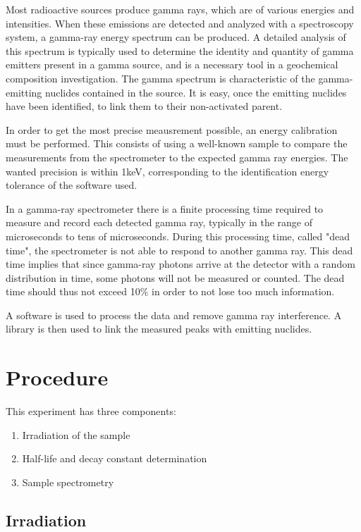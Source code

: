 Most radioactive sources produce gamma rays, which are of various energies and intensities. When these emissions are detected and analyzed with a spectroscopy system, a gamma-ray energy spectrum can be produced. A detailed analysis of this spectrum is typically used to determine the identity and quantity of gamma emitters present in a gamma source, and is a necessary tool in a geochemical composition investigation. The gamma spectrum is characteristic of the gamma-emitting nuclides contained in the source. It is easy, once the emitting nuclides have been identified, to link them to their non-activated parent.

In order to get the most precise meausrement possible, an energy calibration must be performed. This consists of using a well-known sample to compare the measurements from the spectrometer to the expected gamma ray energies. The wanted precision is within 1keV, corresponding to the identification energy tolerance of the software used.

In a gamma-ray spectrometer there is a finite processing time required to measure and record each detected gamma ray, typically in the range of microseconds to tens of microseconds. During this processing time, called "dead time", the spectrometer is not able to respond to another gamma ray. This dead time implies that since gamma-ray photons arrive at the detector with a random distribution in time, some photons will not be measured or counted. The dead time should thus not exceed 10\% in order to not lose too much information.

A software is used to process the data and remove gamma ray interference. A library is then used to link the measured peaks with emitting nuclides.


\section{Procedure}
\label{sec:procedure}

This experiment has three components:

\begin{enumerate}
\item Irradiation of the sample
\item Half-life and decay constant determination
\item Sample spectrometry
\end{enumerate}

\subsection{Irradiation}

